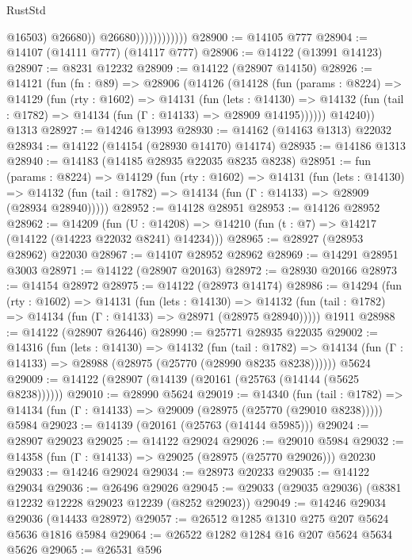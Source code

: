\begin{lexlean}{RustStd}
\begin{coremodule}
                                  @16503)
                                @26680))
                            @26680))))))))))))
@28900 := @14105 @777
@28904 := @14107 (@14111 @777) (@14117 @777)
@28906 := @14122 (@13991 @14123)
@28907 := @8231 @12232
@28909 := @14122 (@28907 @14150)
@28926 := @14121
    (fun (fn : @89) =>
    @28906
      (@14126
        (@14128
          (fun (params : @8224) =>
          @14129
            (fun (rty : @1602) =>
            @14131
              (fun (lets : @14130) =>
              @14132 (fun (tail : @1782) => @14134 (fun (Γ : @14133) => @28909 @14195))))))
        @14240))
    @1313
@28927 := @14246 @13993
@28930 := @14162 (@14163 @1313) @22032
@28934 := @14122 (@14154 (@28930 @14170) @14174)
@28935 := @14186 @1313
@28940 := @14183 (@14185 @28935 @22035 @8235 @8238)
@28951 := fun (params : @8224) =>
  @14129
    (fun (rty : @1602) =>
    @14131
      (fun (lets : @14130) =>
      @14132 (fun (tail : @1782) => @14134 (fun (Γ : @14133) => @28909 (@28934 @28940)))))
@28952 := @14128 @28951
@28953 := @14126 @28952
@28962 := @14209
    (fun (U : @14208) => @14210 (fun (t : @7) => @14217 (@14122 (@14223 @22032 @8241) @14234)))
@28965 := @28927 (@28953 @28962) @22030
@28967 := @14107 @28952 @28962
@28969 := @14291 @28951 @3003
@28971 := @14122 (@28907 @20163)
@28972 := @28930 @20166
@28973 := @14154 @28972
@28975 := @14122 (@28973 @14174)
@28986 := @14294
    (fun (rty : @1602) =>
    @14131
      (fun (lets : @14130) =>
      @14132 (fun (tail : @1782) => @14134 (fun (Γ : @14133) => @28971 (@28975 @28940)))))
    @1911
@28988 := @14122 (@28907 @26446)
@28990 := @25771 @28935 @22035
@29002 := @14316
    (fun (lets : @14130) =>
    @14132
      (fun (tail : @1782) =>
      @14134 (fun (Γ : @14133) => @28988 (@28975 (@25770 (@28990 @8235 @8238))))))
    @5624
@29009 := @14122 (@28907 (@14139 (@20161 (@25763 (@14144 (@5625 @8238))))))
@29010 := @28990 @5624
@29019 := @14340
    (fun (tail : @1782) => @14134 (fun (Γ : @14133) => @29009 (@28975 (@25770 (@29010 @8238)))))
    @5984
@29023 := @14139 (@20161 (@25763 (@14144 @5985)))
@29024 := @28907 @29023
@29025 := @14122 @29024
@29026 := @29010 @5984
@29032 := @14358 (fun (Γ : @14133) => @29025 (@28975 (@25770 @29026))) @20230
@29033 := @14246 @29024
@29034 := @28973 @20233
@29035 := @14122 @29034
@29036 := @26496 @29026
@29045 := @29033 (@29035 @29036) (@8381 @12232 @12228 @29023 @12239 (@8252 @29023))
@29049 := @14246 @29034 @29036 (@14433 @28972)
@29057 := @26512 @1285 @1310 @275 @207 @5624 @5636 @1816 @5984
@29064 := @26522 @1282 @1284 @16 @207 @5624 @5634 @5626
@29065 := @26531 @596

\end{coremodule}
\end{lexlean}
